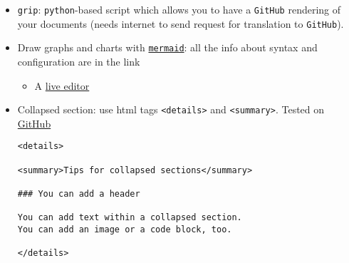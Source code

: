 \documentclass[a4paper,12pt,%
              final%
              ]{article}
\begin{document}
\begin{itemize}
\begin{itemize}
\begin{itemize}
          \item Display: double dollar, e.g., \verb|$$ \alpha $$| or code-block
\begin{verbatim}
```math
\alpha
```
\end{verbatim}
        \end{itemize}
      \item \texttt{GitHub}
        \begin{itemize}
          \item \href{https://docs.github.com/en/get-started/writing-on-github/working-with-advanced-formatting/writing-mathematical-expressions}{Official docs}
          \item Inline: dollar, e.g., \verb|$\alpha$|
          \item Display: double dollar, e.g., \verb|$$ \alpha $$| or code-block
\begin{verbatim}
```math
\alpha
```
\end{verbatim}
          \item {[Deprecated workaround]} However, there seems to be some workarounds, see \href{https://stackoverflow.com/questions/11256433/how-to-show-math-equations-in-general-githubs-markdownnot-githubs-blog}{here} (linking to third-party render) or \href{https://gist.github.com/cyhsutw/d5983d166fb70ff651f027b2aa56ee4e}{here} (write \LaTeX{} code inside a \texttt{jupyter} notebook, for tips about \LaTeX{} and \texttt{jupyter} see \texttt{python} section, \ref{sec:python}, and/or \href{https://jupyterbook.org/content/math.html}{here})
        \end{itemize}
    \end{itemize}
  \item \texttt{grip}: \texttt{python}-based script which allows you to have a \texttt{GitHub} rendering of your documents (needs internet to send request for translation to \texttt{GitHub}).
  \item Draw graphs and charts with \href{https://mermaid-js.github.io/mermaid/#/}{\texttt{mermaid}}: all the info about syntax and configuration are in the link
    \begin{itemize}
      \item A \href{https://mermaid-js.github.io/mermaid-live-editor}{live editor}
    \end{itemize}
  \item Collapsed section: use html tags \texttt{<details>} and \texttt{<summary>}. Tested on \href{https://docs.github.com/en/get-started/writing-on-github/working-with-advanced-formatting/organizing-information-with-collapsed-sections}{GitHub}
\begin{verbatim}
<details>

<summary>Tips for collapsed sections</summary>

### You can add a header

You can add text within a collapsed section.
You can add an image or a code block, too.

</details>
\end{verbatim}
\end{itemize}
\end{document}
